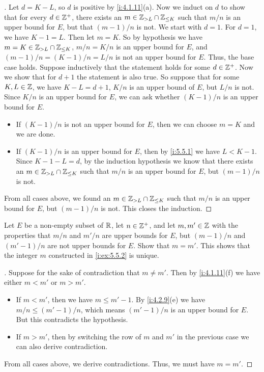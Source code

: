 \begin{proof}[]
  Let \(d = K - L\), so \(d\) is positive by \cref{i:4.1.11}(a).
  Now we induct on \(d\) to show that for every \(d \in \mathbb{Z}^+\), there exists an \(m \in \mathbb{Z}_{> L} \cap \mathbb{Z}_{\leq K}\) such that \(m / n\) is an upper bound for \(E\), but that \((m - 1) / n\) is not.
  We start with \(d = 1\).
  For \(d = 1\), we have \(K - 1 = L\).
  Then let \(m = K\).
  So by hypothesis we have \(m = K \in \mathbb{Z}_{> L} \cap \mathbb{Z}_{\leq K}\), \(m / n = K / n\) is an upper bound for \(E\), and \((m - 1) / n = (K - 1) / n = L / n\) is not an upper bound for \(E\).
  Thus, the base case holds.
  Suppose inductively that the statement holds for some \(d \in \mathbb{Z}^+\).
  Now we show that for \(d + 1\) the statement is also true.
  So suppose that for some \(K, L \in \mathbb{Z}\), we have \(K - L = d + 1\), \(K / n\) is an upper bound of \(E\), but \(L / n\) is not.
  Since \(K / n\) is an upper bound for \(E\), we can ask whether \((K - 1) / n\) is an upper bound for \(E\).
  \begin{itemize}
    \item If \((K - 1) / n\) is not an upper bound for \(E\), then we can choose \(m = K\) and we are done.
    \item If \((K - 1) / n\) is an upper bound for \(E\), then by \cref{i:5.5.1} we have \(L < K - 1\).
          Since \(K - 1 - L = d\), by the induction hypothesis we know that there exists an \(m \in \mathbb{Z}_{> L} \cap \mathbb{Z}_{\leq K}\) such that \(m / n\) is an upper bound for \(E\), but \((m - 1) / n\) is not.
  \end{itemize}
  From all cases above, we found an \(m \in \mathbb{Z}_{> L} \cap \mathbb{Z}_{\leq K}\) such that \(m / n\) is an upper bound for \(E\), but \((m - 1) / n\) is not.
  This closes the induction.
\end{proof}

\begin{ex}\label{i:ex:5.5.3}
  Let \(E\) be a non-empty subset of \(\mathbb{R}\), let \(n \in \mathbb{Z}^+\), and let \(m, m' \in \mathbb{Z}\) with the properties that \(m / n\) and \(m' / n\) are upper bounds for \(E\), but \((m - 1) / n\) and \((m' - 1) / n\) are not upper bounds for \(E\).
  Show that \(m = m'\).
  This shows that the integer \(m\) constructed in \cref{i:ex:5.5.2} is unique.
\end{ex}

\begin{proof}[]
  Suppose for the sake of contradiction that \(m \neq m'\).
  Then by \cref{i:4.1.11}(f) we have either \(m < m'\) or \(m > m'\).
  \begin{itemize}
    \item If \(m < m'\), then we have \(m \leq m' - 1\).
          By \cref{i:4.2.9}(e) we have \(m / n \leq (m' - 1) / n\), which means \((m' - 1) / n\) is an upper bound for \(E\).
          But this contradicts the hypothesis.
    \item If \(m > m'\), then by switching the row of \(m\) and \(m'\) in the previous case we can also derive contradiction.
  \end{itemize}
  From all cases above, we derive contradictions.
  Thus, we must have \(m = m'\).
\end{proof}

